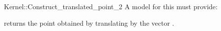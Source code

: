 \begin{ccRefFunctionObjectConcept}{Kernel::Construct_translated_point_2}
A model for this must provide:


       {returns the point obtained by translating  by the vector 
        .}

\ccIsModel{}

\end{ccRefFunctionObjectConcept}

